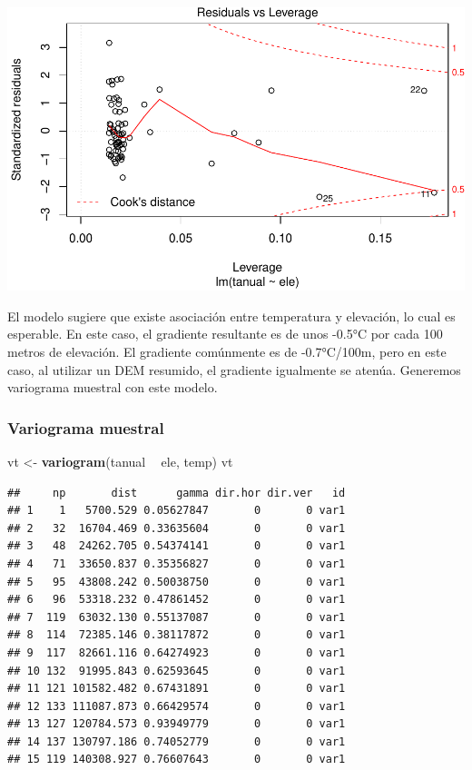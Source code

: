 \documentclass[11pt,]{article}
\newenvironment{Shaded}{\begin{snugshade}}{\end{snugshade}}
\newcommand{\KeywordTok}[1]{\textcolor[rgb]{0.13,0.29,0.53}{\textbf{#1}}}
\newcommand{\StringTok}[1]{\textcolor[rgb]{0.31,0.60,0.02}{#1}}
\newcommand{\OperatorTok}[1]{\textcolor[rgb]{0.81,0.36,0.00}{\textbf{#1}}}
\newcommand{\NormalTok}[1]{#1}
\begin{document}
\includegraphics[width=600px]{proyecto_files/figure-latex/agregar-y-modelo-5}

El modelo sugiere que existe asociación entre temperatura y elevación,
lo cual es esperable. En este caso, el gradiente resultante es de unos
-0.5°C por cada 100 metros de elevación. El gradiente comúnmente es de
-0.7°C/100m, pero en este caso, al utilizar un DEM resumido, el
gradiente igualmente se atenúa. Generemos variograma muestral con este
modelo.

\subsubsection{Variograma muestral}\label{variograma-muestral}

\begin{Shaded}
\begin{Highlighting}[]
\NormalTok{vt <-}\StringTok{ }\KeywordTok{variogram}\NormalTok{(tanual }\OperatorTok{~}\StringTok{ }\NormalTok{ele, temp)}
\NormalTok{vt}
\end{Highlighting}
\end{Shaded}

\begin{verbatim}
##     np       dist      gamma dir.hor dir.ver   id
## 1    1   5700.529 0.05627847       0       0 var1
## 2   32  16704.469 0.33635604       0       0 var1
## 3   48  24262.705 0.54374141       0       0 var1
## 4   71  33650.837 0.35356827       0       0 var1
## 5   95  43808.242 0.50038750       0       0 var1
## 6   96  53318.232 0.47861452       0       0 var1
## 7  119  63032.130 0.55137087       0       0 var1
## 8  114  72385.146 0.38117872       0       0 var1
## 9  117  82661.116 0.64274923       0       0 var1
## 10 132  91995.843 0.62593645       0       0 var1
## 11 121 101582.482 0.67431891       0       0 var1
## 12 133 111087.873 0.66429574       0       0 var1
## 13 127 120784.573 0.93949779       0       0 var1
## 14 137 130797.186 0.74052779       0       0 var1
## 15 119 140308.927 0.76607643       0       0 var1
\end{verbatim}
\end{document}
